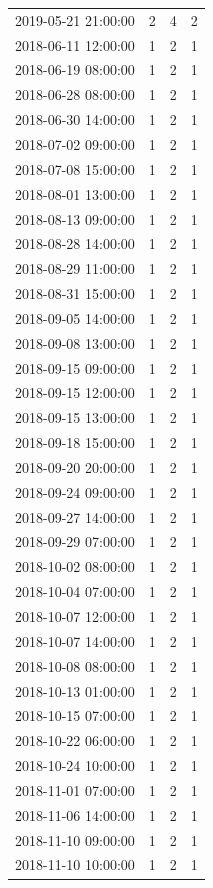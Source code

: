 \begin{tabular}{lrrr}
2019-05-21 21:00:00 & 2 & 4 & 2 \\
2018-06-11 12:00:00 & 1 & 2 & 1 \\
2018-06-19 08:00:00 & 1 & 2 & 1 \\
2018-06-28 08:00:00 & 1 & 2 & 1 \\
2018-06-30 14:00:00 & 1 & 2 & 1 \\
2018-07-02 09:00:00 & 1 & 2 & 1 \\
2018-07-08 15:00:00 & 1 & 2 & 1 \\
2018-08-01 13:00:00 & 1 & 2 & 1 \\
2018-08-13 09:00:00 & 1 & 2 & 1 \\
2018-08-28 14:00:00 & 1 & 2 & 1 \\
2018-08-29 11:00:00 & 1 & 2 & 1 \\
2018-08-31 15:00:00 & 1 & 2 & 1 \\
2018-09-05 14:00:00 & 1 & 2 & 1 \\
2018-09-08 13:00:00 & 1 & 2 & 1 \\
2018-09-15 09:00:00 & 1 & 2 & 1 \\
2018-09-15 12:00:00 & 1 & 2 & 1 \\
2018-09-15 13:00:00 & 1 & 2 & 1 \\
2018-09-18 15:00:00 & 1 & 2 & 1 \\
2018-09-20 20:00:00 & 1 & 2 & 1 \\
2018-09-24 09:00:00 & 1 & 2 & 1 \\
2018-09-27 14:00:00 & 1 & 2 & 1 \\
2018-09-29 07:00:00 & 1 & 2 & 1 \\
2018-10-02 08:00:00 & 1 & 2 & 1 \\
2018-10-04 07:00:00 & 1 & 2 & 1 \\
2018-10-07 12:00:00 & 1 & 2 & 1 \\
2018-10-07 14:00:00 & 1 & 2 & 1 \\
2018-10-08 08:00:00 & 1 & 2 & 1 \\
2018-10-13 01:00:00 & 1 & 2 & 1 \\
2018-10-15 07:00:00 & 1 & 2 & 1 \\
2018-10-22 06:00:00 & 1 & 2 & 1 \\
2018-10-24 10:00:00 & 1 & 2 & 1 \\
2018-11-01 07:00:00 & 1 & 2 & 1 \\
2018-11-06 14:00:00 & 1 & 2 & 1 \\
2018-11-10 09:00:00 & 1 & 2 & 1 \\
2018-11-10 10:00:00 & 1 & 2 & 1 \\

\end{tabular}
